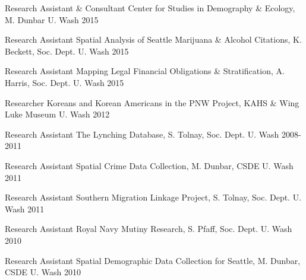 \begin{cvhonors}
  \cvhonor
    {Research Assistant \& Consultant} %
    {Center for Studies in Demography \& Ecology, M. Dunbar} %
    {U. Wash} %
    {2015} %

  \cvhonor
    {Research Assistant} %
    {Spatial Analysis of Seattle Marijuana \& Alcohol Citations, K. Beckett, Soc. Dept.} %
    {U. Wash} %
    {2015} %

  \cvhonor
    {Research Assistant} %
    {Mapping Legal Financial Obligations \& Stratification, A. Harris, Soc. Dept.} %
    {U. Wash} %
    {2015} %

  \cvhonor
    {Researcher} %
    {Koreans and Korean Americans in the PNW Project, KAHS \& Wing Luke Museum} %
    {U. Wash} %
    {2012} %

  \cvhonor
    {Research Assistant} %
    {The Lynching Database, S. Tolnay, Soc. Dept.} %
    {U. Wash} %
    {2008-2011} %

  \cvhonor
    {Research Assistant} %
    {Spatial Crime Data Collection, M. Dunbar, CSDE} %
    {U. Wash} %
    {2011} %

  \cvhonor
    {Research Assistant} %
    {Southern Migration Linkage Project, S. Tolnay, Soc. Dept.} %
    {U. Wash} %
    {2011} %

  \cvhonor
    {Research Assistant} %
    {Royal Navy Mutiny Research, S. Pfaff, Soc. Dept.} %
    {U. Wash} %
    {2010} %

  \cvhonor
    {Research Assistant} %
    {Spatial Demographic Data Collection for Seattle, M. Dunbar, CSDE} %
    {U. Wash} %
    {2010} %


\end{cvhonors}


